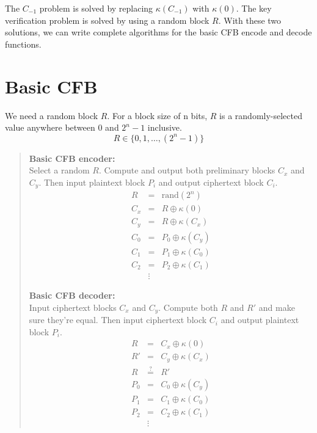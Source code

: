 \documentclass{article}
\newcommand{\xqeq}{\overset{?}{=}}
\begin{document}
The $C_{-1}$ problem is solved by replacing $\kappa(C_{-1})$ with $\kappa(0)$.
The key verification problem is solved by using a random block $R$.
With these two solutions, we can write complete algorithms 
for the basic CFB encode and decode functions.


\section*{Basic CFB} 

We need a random block $R$.  For a block size of n bits, 
$R$ is a randomly-selected value anywhere between 0 and $2^n-1$ inclusive.
\[ R \in \{ 0, 1, \ldots, (2^n-1) \} \]

\begin{quote}
\textbf{Basic CFB encoder:}\\
Select a random $R$.
Compute and output both preliminary blocks $C_x$ and $C_y$.
Then input plaintext block $P_i$ and output ciphertext block $C_i$.
\begin{eqnarray*}
  R    &=&  \mathrm{rand}(2^n) \\
  C_x  &=&  R  \oplus  \kappa(0)  \\
  C_y  &=&  R  \oplus  \kappa(C_x)  \\
  C_0  &=&  P_0  \oplus  \kappa(C_y)  \\
  C_1  &=&  P_1  \oplus  \kappa(C_0)  \\
  C_2  &=&  P_2  \oplus  \kappa(C_1)  \\
  &\vdots&
\end{eqnarray*}

\textbf{Basic CFB decoder:}\\
Input ciphertext blocks $C_x$ and $C_y$.
Compute both $R$ and $R'$ and make sure they're equal.
Then input ciphertext block $C_i$ and output plaintext block $P_i$.
\begin{eqnarray*}
  R  &=&  C_x  \oplus  \kappa(0)  \\
  R' &=&  C_y  \oplus  \kappa(C_x)  \\
  R  &\xqeq&  R' \\
  P_0  &=&  C_0  \oplus  \kappa(C_y)  \\
  P_1  &=&  C_1  \oplus  \kappa(C_0)  \\
  P_2  &=&  C_2  \oplus  \kappa(C_1)  \\
  &\vdots&
\end{eqnarray*}
\end{quote}
\end{document}
